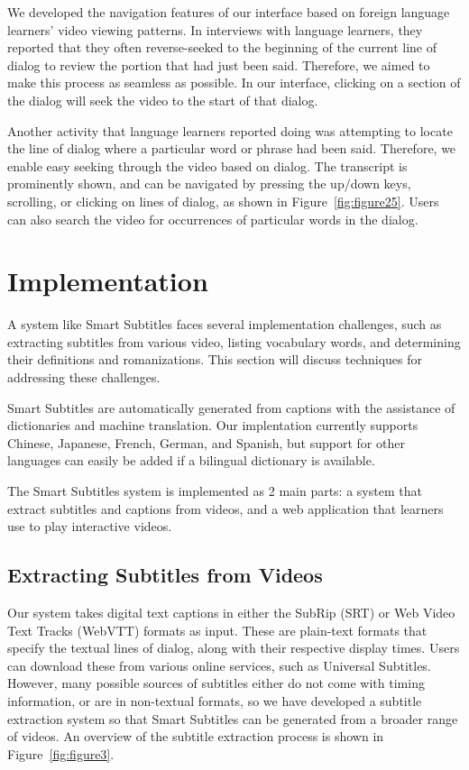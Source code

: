 \documentclass{sigchi}
\begin{document}
We developed the navigation features of our interface based
on foreign language learners’ video viewing patterns. In
interviews with language learners, they reported
that they often reverse-seeked to the beginning of the current
line of dialog to review the portion that had just been said.
Therefore, we aimed to make this process as seamless as possible.
In our interface, clicking on a section of the dialog will
seek the video to the start of that dialog.

Another activity that language learners reported doing was attempting to locate the line of dialog where a particular word or phrase had been said. Therefore, we enable easy seeking through the video based on dialog. The transcript is prominently shown, and can be navigated by pressing the up/down keys, scrolling, or clicking on lines of dialog, as shown in Figure~\ref{fig:figure25}. Users can also search the video for occurrences of particular words in the dialog.

\section{Implementation}

A system like Smart Subtitles faces several implementation challenges, such as extracting subtitles from various video, listing vocabulary words, and determining their definitions and romanizations. This section will discuss techniques for addressing these challenges.

Smart Subtitles are automatically generated from 
captions with the assistance of dictionaries and 
machine translation. Our implentation currently supports Chinese, Japanese, French, German, and Spanish, but support for other languages can easily be added if a bilingual dictionary is available.

The Smart Subtitles system
is implemented as 2 main parts:
a system that extract subtitles and captions from videos,
and a web application that learners use to play interactive videos.

\subsection{Extracting Subtitles from Videos}

Our system takes digital text captions in either the SubRip (SRT) \cite{subrip} or Web Video Text Tracks (WebVTT) formats \cite{webvtt} as input.
These are plain-text formats that specify the textual lines of dialog, along with their respective display times.
Users can download these from
various online services, such as Universal Subtitles.
However, many possible sources of subtitles either
do not come with timing information, or are in
non-textual formats, so we have developed 
a subtitle extraction system so that Smart Subtitles
can be generated from a broader range of videos.
An overview of the subtitle extraction process
is shown in Figure~\ref{fig:figure3}.
\end{document}
